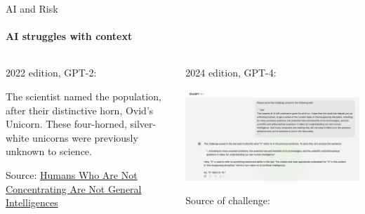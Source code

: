 \begin{frame}{AI and Risk}
  \framesubtitle{AI struggles with context}
  \begin{columns}[T] %
    \begin{column}{.45\textwidth}
      {\Large 2022 edition, GPT-2}:\newline

      The scientist named the population, after their distinctive horn, Ovid's Unicorn. These four-horned, silver-white unicorns were previously unknown to science.\newline

      Source: \href{https://www.lesswrong.com/posts/4AHXDwcGab5PhKhHT/humans-who-are-not-concentrating-are-not-general}{Humans Who Are Not Concentrating Are Not General Intelligences}

    \end{column}%
    \begin{column}{.45\textwidth}
      {\Large 2024 edition, GPT-4}:\newline
      \begin{center}
        \includegraphics[width=\textwidth]{graphics/melanie-mitchell-it-challenge}
      \end{center}

      Source of challenge: \cite{mitchell2019artificial}
    \end{column}%
\end{columns}

\end{frame}

